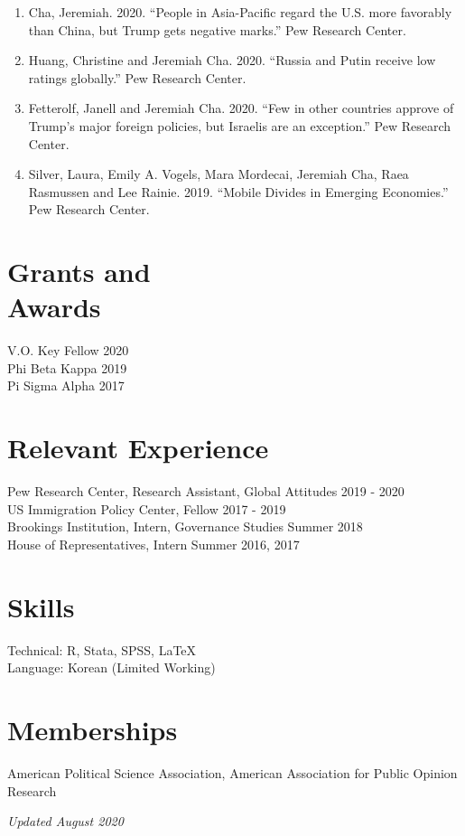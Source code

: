\documentclass[margin, line]{res}
\begin{document}
\begin{resume}
\begin{enumerate}
\item Cha, Jeremiah. 2020. ``People in Asia-Pacific regard the U.S. more favorably than China, but Trump gets negative marks.'' Pew Research Center.

\item Huang, Christine and Jeremiah Cha. 2020. ``Russia and Putin receive low ratings globally.'' Pew Research Center.

\item Fetterolf, Janell and Jeremiah Cha. 2020. ``Few in other countries approve of Trump’s major foreign policies, but Israelis are an exception.'' Pew Research Center.

\item Silver, Laura, Emily A. Vogels, Mara Mordecai, Jeremiah Cha, Raea Rasmussen and Lee Rainie. 2019. ``Mobile Divides in Emerging Economies.'' Pew Research Center.

\end{enumerate}

\section{Grants and \\Awards}  
V.O. Key Fellow \hfill 2020\\
Phi Beta Kappa \hfill 2019\\
Pi Sigma Alpha \hfill 2017

\section{Relevant Experience}
Pew Research Center, Research Assistant, Global Attitudes \hfill 2019 - 2020\\
US Immigration Policy Center, Fellow \hfill 2017 - 2019\\
Brookings Institution, Intern, Governance Studies \hfill Summer 2018\\
House of Representatives, Intern \hfill Summer 2016, 2017
	
\section{Skills} 
Technical: R, Stata, SPSS, \LaTeX\\
Language: Korean (Limited Working)

\section{Memberships}
American Political Science Association, American Association for Public Opinion Research

\small{\textit{Updated August 2020}}

\end{resume}
\end{document}

